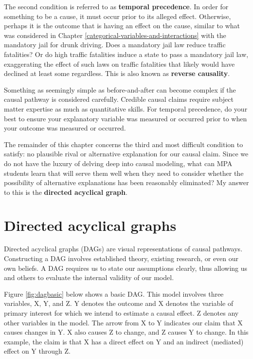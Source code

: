 \documentclass[
]{book}
\begin{document}
The second condition is referred to as \textbf{temporal precedence}. In order for something to be a cause, it must occur prior to its alleged effect. Otherwise, perhaps it is the outcome that is having an effect on the cause, similar to what was considered in Chapter \ref{categorical-variables-and-interactions} with the mandatory jail for drunk driving. Does a mandatory jail law reduce traffic fatalities? Or do high traffic fatalities induce a state to pass a mandatory jail law, exaggerating the effect of such laws on traffic fatalities that likely would have declined at least some regardless. This is also known as \textbf{reverse causality}.

Something as seemingly simple as before-and-after can become complex if the causal pathway is considered carefully. Credible causal claims require subject matter expertise as much as quantitative skills. For temporal precedence, do your best to ensure your explanatory variable was measured or occurred prior to when your outcome was measured or occurred.

The remainder of this chapter concerns the third and most difficult condition to satisfy: no plausible rival or alternative explanation for our causal claim. Since we do not have the luxury of delving deep into causal modeling, what can MPA students learn that will serve them well when they need to consider whether the possibility of alternative explanations has been reasonably eliminated? My answer to this is the \textbf{directed acyclical graph}.

\hypertarget{directed-acyclical-graphs}{%
\section{Directed acyclical graphs}\label{directed-acyclical-graphs}}

Directed acyclical graphs (DAGs) are visual representations of causal pathways. Constructing a DAG involves established theory, existing research, or even our own beliefs. A DAG requires us to state our assumptions clearly, thus allowing us and others to evaluate the internal validity of our model.

Figure \ref{fig:dagbasic} below shows a basic DAG. This model involves three variables, X, Y, and Z. Y denotes the outcome and X denotes the variable of primary interest for which we intend to estimate a causal effect. Z denotes any other variables in the model. The arrow from X to Y indicates our claim that X causes changes in Y. X also causes Z to change, and Z causes Y to change. In this example, the claim is that X has a direct effect on Y and an indirect (mediated) effect on Y through Z.
\end{document}
